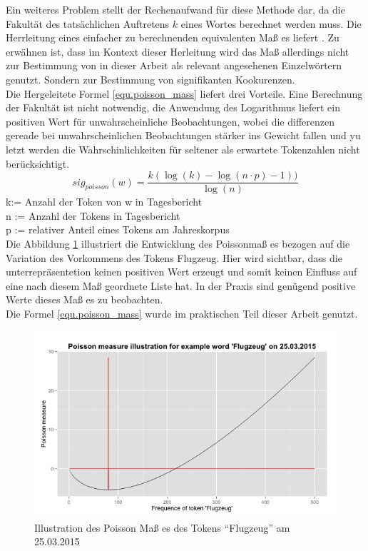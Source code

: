 Ein weiteres Problem stellt der Rechenaufwand für diese Methode dar, da die Fakultät des tatsächlichen Auftretens $k$ eines Wortes berechnet werden muss. Die Herrleitung eines einfacher zu berechnenden 
equivalenten Maß es liefert \cite[S. 338 ff]{heyer06}. Zu erwähnen ist, dass im Kontext dieser Herleitung wird das Maß allerdings nicht zur Bestimmung von in dieser Arbeit als relevant angesehenen Einzelwörtern genutzt. Sondern zur Bestimmung von signifikanten Kookurenzen. \\
Die Hergeleitete Formel \ref{equ.poisson_mass} liefert drei Vorteile. Eine Berechnung der Fakultät ist nicht notwendig, die Anwendung des Logarithmus liefert ein positiven Wert für unwahrscheinliche Beobachtungen, wobei die differenzen gereade bei unwahrscheinlichen Beobachtungen stärker ins Gewicht fallen und yu letzt werden die Wahrschinlichkeiten für seltener als erwartete Tokenzahlen nicht berücksichtigt. 
 \begin{equation}\label{equ.poisson_mass}
		sig_{poisson}(w) = \frac{k(\log(k)-\log(n\cdot p) -1 ))}{\log(n)} 
 \end{equation}
 k:= Anzahl der Token von w in Tagesbericht\\
n := Anzahl der Tokens in Tagesbericht\\
p := relativer Anteil eines Tokens am Jahreskorpus\\

Die Abbildung \ref{pic.poisson_mass} illustriert die Entwicklung des Poissonmaß es bezogen auf die Variation des Vorkommens des Tokens Flugzeug. Hier wird sichtbar, dass die unterrepräsentetion keinen positiven Wert erzeugt und somit keinen Einfluss auf eine nach diesem Maß  geordnete Liste hat. In der Praxis sind genügend positive Werte dieses Maß es zu beobachten.\\
Die Formel \ref{equ.poisson_mass} wurde im praktischen Teil dieser Arbeit genutzt.\\
 
\begin{figure}[h!]
    \centering
    \includegraphics[width=1\textwidth]{pictures/poissonMeasureFlugzeug.png}
    \caption{Illustration des Poisson Maß es des Tokens \enquote{Flugzeug} am 25.03.2015}\label{pic.poisson_mass}
\end{figure}


